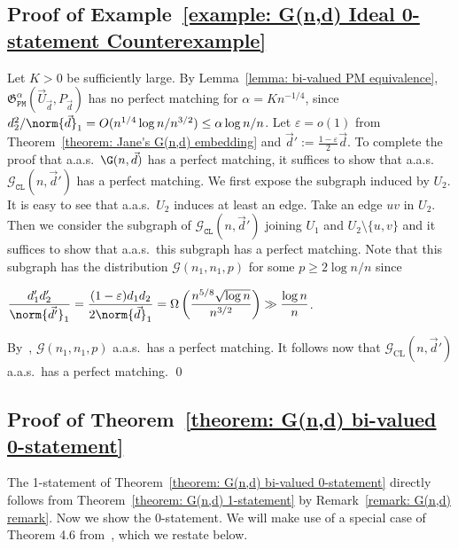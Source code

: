 \documentclass[12pt]{article}
\begin{document}
\subsection{Proof of Example~\ref{example: G(n,d) Ideal 0-statement Counterexample}}
\label{section: Proof of G(n,d) Ideal 0-statement Counterexample}

Let $K>0$ be sufficiently large.
By Lemma~\ref{lemma: bi-valued PM equivalence},  $\mathfrak{G}_{\texttt{PM}}^{\alpha}(\vec{U}_{\vec{d}}, P_{\vec{d}})$ has no perfect matching for $\alpha = Kn^{-1/4}$, since $d_2^2/\norm{\vec{d}}_1 =O( n^{1/4}\log n/n^{3/2}) \le \alpha\log n/n$. Let $\varepsilon = o(1)$ from Theorem~\ref{theorem: Jane's G(n,d) embedding} and $\vec{d}' := \frac{1-\varepsilon}{2}\vec{d}$. To complete the proof that a.a.s.\ $\G(n,\vec{d})$ has a perfect matching, it suffices to show that a.a.s.\ $\mathcal{G}_{\texttt{CL}}(n, \vec{d}')$ has a perfect matching. We first expose the subgraph induced by $U_2$. It is easy to see that a.a.s.\ $U_2$ induces at least an edge. Take an edge $uv$ in $U_2$.  Then we consider the subgraph of $\mathcal{G}_{\texttt{CL}}(n, \vec{d}')$ joining $U_1$ and $U_2\setminus \{u,v\}$ and it suffices to show that a.a.s.\ this subgraph has a perfect matching. Note that this subgraph has the distribution $\mathcal{G}(n_1,n_1,p)$ for some $p\ge 2\log n/n$ since
\begin{center}
    $\displaystyle\frac{d'_1 d'_2}{\norm{\vec{d}'}_1} = \frac{(1-\varepsilon) d_1 d_2}{2\norm{\vec{d}}_1} =\Omega\left( \frac{n^{5/8}\sqrt{\log n}}{n^{3/2}} \right)\gg\frac{\log n}{n}$.
\end{center}
By~\cite{bipartitePM}, $\mathcal{G}(n_1,n_1,p)$ a.a.s.\ has a perfect matching. It follows now that $\mathcal{G}_{\text{CL}}(n,\vec{d}')$ a.a.s.\ has a perfect matching.
\qed

\subsection{Proof of Theorem~\ref{theorem: G(n,d) bi-valued 0-statement}}
\label{section: proof of G(n,d) 0-statement}

The 1-statement of Theorem~\ref{theorem: G(n,d) bi-valued 0-statement} directly follows from Theorem~\ref{theorem: G(n,d) 1-statement} by Remark~\ref{remark: G(n,d) remark}. 
Now we show the 0-statement. We will make use of a special case of Theorem 4.6 from~\cite{McKay_asymptotics}, which we restate below.
\end{document}
